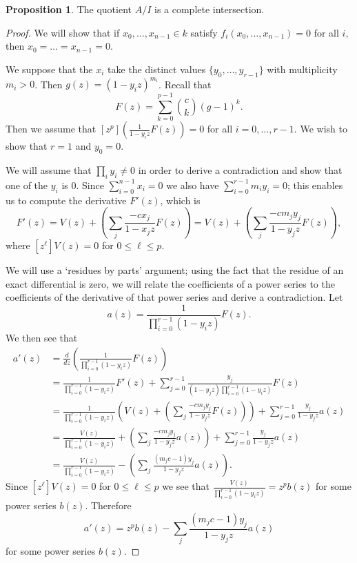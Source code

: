 \documentclass{amsart}
\numberwithin{equation}{section}
\theoremstyle{definition}
\newtheorem{proposition}[theorem]{Proposition}
\begin{document}
\begin{proposition}\label{prop:ci}
The quotient $A/I$ is a complete intersection. 
\end{proposition}
\begin{proof} 
We will show that if $x_0,\dots,x_{n-1} \in k$ satisfy $f_i(x_0,\dots,x_{n-1})=0$ for all $i$, then $x_0=\dots=x_{n-1}=0$. 

We suppose that the $x_i$ take the distinct values $\{y_0,\dots,y_{r-1}\}$ with multiplicity $m_i>0$. Then $g(z)=(1-y_iz)^{m_i}$. Recall that
\[
F(z)=\sum_{k=0}^{p-1} \binom{c}{k}(g-1)^k.
\]
Then we assume that $[z^p]\left(\frac{1}{1-y_iz}F(z)\right)=0$ for all $i=0,\dots,r-1$. We wish to show that $r=1$ and $y_0=0$. 

We will assume that $\prod_i y_i \ne 0$ in order to derive a contradiction and show that one of the $y_i$ is $0$. Since $\sum_{i=0}^{n-1} x_i=0$ we also have $\sum_{i=0}^{r-1} m_iy_i=0$; this enables us to compute the derivative $F'(z)$, which is 
\[
F'(z)=V(z)+\left(\sum_j \frac{-cx_j}{1-x_jz}F(z)\right)=V(z)+\left(\sum_j \frac{-cm_jy_j}{1-y_jz}F(z)\right),
\]
where $[z^\ell]V(z)=0$ for $0 \le \ell \le p$. 

We will use a `residues by parts' argument; using the fact that the residue of an exact differential is zero, we will relate the coefficients of a power series to the coefficients of the derivative of that power series and derive a contradiction. 
Let
\[
a(z)=\frac{1}{\prod_{i=0}^{r-1}(1-y_iz)}F(z).
\]
We then see that
\begin{align*}
a'(z)&=\frac{d}{dz}\left(\frac{1}{\prod_{i=0}^{r-1}(1-y_iz)}F(z)\right)\\
&=\frac{1}{\prod_{i=0}^{r-1}(1-y_iz)}F'(z)+\sum_{j=0}^{r-1}\frac{y_j}{(1-y_jz)\prod_{i=0}^{r-1}(1-y_iz)}F(z)\\
&=\frac{1}{\prod_{i=0}^{r-1}(1-y_iz)}\left(V(z)+\left(\sum_j \frac{-cm_jy_j}{1-y_jz}F(z)\right)\right)+\sum_{j=0}^{r-1}\frac{y_j}{1-y_jz}a(z)\\
&=\frac{V(z)}{\prod_{i=0}^{r-1}(1-y_iz)}+\left(\sum_j \frac{-cm_jy_j}{1-y_jz}a(z)\right)+\sum_{j=0}^{r-1}\frac{y_j}{1-y_jz}a(z)\\
&=\frac{V(z)}{\prod_{i=0}^{r-1}(1-y_iz)}-\left(\sum_j \frac{(m_jc-1)y_j}{1-y_jz}a(z)\right).
\end{align*}
Since $[z^\ell]V(z)=0$ for $0 \le \ell \le p$ we see that $\frac{V(z)}{\prod_{i=0}^{r-1}(1-y_iz)}=z^pb(z)$ for some power series $b(z)$. Therefore
\[
a'(z)=z^pb(z)-\sum_j \frac{(m_jc-1)y_j}{1-y_jz}a(z)
\]
for some power series $b(z)$.


\end{proof}
\end{document}
